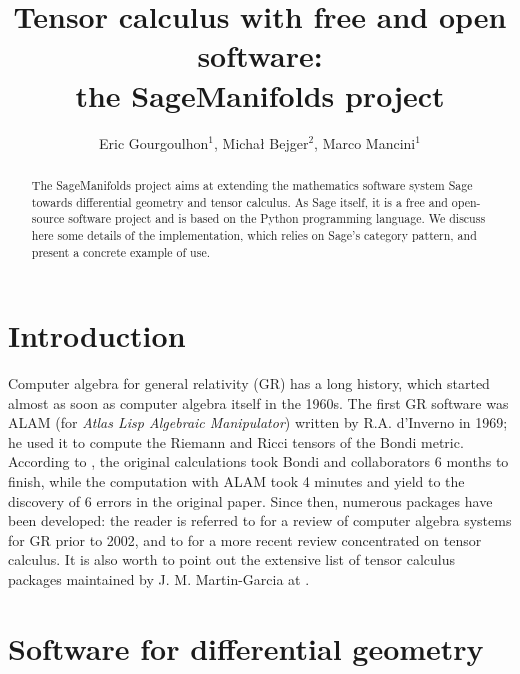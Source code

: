 \documentclass[a4paper]{jpconf}
\newcommand{\soft}[1]{\textsf{#1}}
\newcommand{\Sage}{\soft{Sage}}
\newcommand{\SM}{\soft{SageManifolds}}
\begin{document}
\title{Tensor calculus with free and open software: \\
the SageManifolds project}

\author{Eric Gourgoulhon$^1$, Micha\l{} Bejger$^2$, Marco Mancini$^1$}

\address{$^1$ Laboratoire Univers et Th\'eories, UMR 8102 du 
CNRS, Observatoire de Paris, Universit\'e Paris Diderot,
92190 Meudon, France}

\address{$^2$ Centrum Astronomiczne im. M. Kopernika, ul. Bartycka 18,
00-716 Warsaw, Poland}


\begin{abstract}
The \SM{} project aims at extending the mathematics software system \Sage{} towards
differential geometry and tensor calculus. As \Sage{} itself, it is a free 
and open-source software project and is based on the Python programming language.
We discuss here some details of the implementation, which relies 
on \Sage{}'s category pattern, and present a concrete example of use.
\end{abstract}

\section{Introduction}

Computer algebra for general relativity (GR) has a long history, which started
almost as soon as computer algebra itself in the 1960s. 
The first GR software was \soft{ALAM} (for \emph{Atlas Lisp Algebraic Manipulator})
written by R.A. d'Inverno in 1969; he used it to compute
the Riemann and Ricci tensors of the Bondi metric.
According to \cite{Skea94}, 
the original calculations took Bondi and collaborators 6 months to finish,
while the computation with \soft{ALAM} took 4 minutes and yield to the 
discovery of 6 errors in the original paper. 
Since then, numerous packages have been developed: the reader is referred to \cite{MacCa02}
for a review of computer algebra
systems for GR prior to 2002, and to \cite{KorolKS13} for a more recent review 
concentrated on tensor calculus. 
It is also worth to point out the extensive list of
tensor calculus packages maintained by J. M. Martin-Garcia at \cite{xact_links}.


\section{Software for differential geometry}
\end{document}
